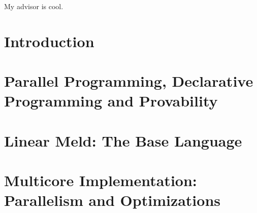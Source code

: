\documentclass[12pt]{cmuthesis}
\theoremstyle{indented}
\begin{document}
 

%
\pagestyle{plain} %




\begin{acknowledgments}
My advisor is cool.
\end{acknowledgments}

\tableofcontents
\listoffigures
\listoftables
\renewcommand{\listtheoremname}{List of Equations}
\listoftheorems

\mainmatter


%
%
%
%
%

\chapter{Introduction}


\chapter{Parallel Programming, Declarative Programming and Provability}


\chapter{Linear Meld: The Base Language}



\chapter{Multicore Implementation: Parallelism and Optimizations}\label{chapter:implementation}

\end{document}
